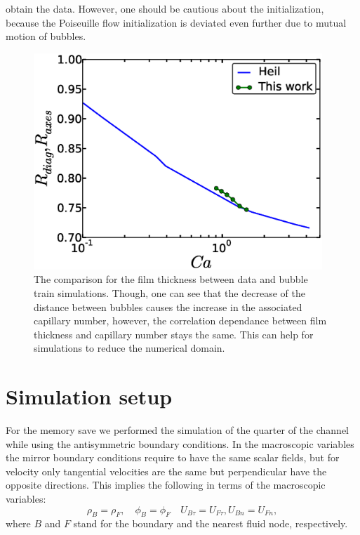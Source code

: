 \documentclass{article}
\begin{document}
obtain the data. However, one should be cautious about the initialization, because the Poiseuille
flow initialization is deviated even further due to mutual motion of bubbles.
\begin{figure}
\includegraphics[width=0.97\textwidth]{Figures/capillaries_comparison_train.eps}
\caption{The comparison for the film thickness between \citet{heil-threedim} data and bubble train
simulations. Though, one can see that the decrease of the distance between bubbles causes the
increase in the associated capillary number, however, the correlation dependance between film
thickness and capillary number stays the same. This can help for simulations to reduce the
numerical domain. \label{fig:capillaries:train}}
\end{figure}


\section{Simulation setup}

\label{append:sym}
For the memory save we performed the simulation of the quarter of the channel while using the
antisymmetric boundary conditions. In the macroscopic variables the mirror boundary conditions
require to have the same scalar fields, but for velocity only tangential velocities are the same
but perpendicular have the opposite directions. This implies the following in terms of the
macroscopic variables:
\begin{equation}
\rho_B = \rho_F, \quad \phi_B = \phi_F \quad U_{B\tau}=U_{F\tau}, U_{B n}=U_{F n}, 
\end{equation}
 where $B$ and $F$ stand for the boundary and the nearest fluid node, respectively. 
\end{document}
